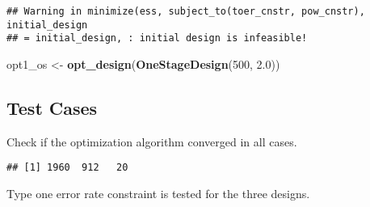 \documentclass[]{book}
\newenvironment{Shaded}{\begin{snugshade}}{\end{snugshade}}
\newcommand{\ControlFlowTok}[1]{\textcolor[rgb]{0.13,0.29,0.53}{\textbf{#1}}}
\newcommand{\DecValTok}[1]{\textcolor[rgb]{0.00,0.00,0.81}{#1}}
\newcommand{\FloatTok}[1]{\textcolor[rgb]{0.00,0.00,0.81}{#1}}
\newcommand{\KeywordTok}[1]{\textcolor[rgb]{0.13,0.29,0.53}{\textbf{#1}}}
\newcommand{\NormalTok}[1]{#1}
\newcommand{\OperatorTok}[1]{\textcolor[rgb]{0.81,0.36,0.00}{\textbf{#1}}}
\newcommand{\StringTok}[1]{\textcolor[rgb]{0.31,0.60,0.02}{#1}}
\begin{document}
\begin{verbatim}
## Warning in minimize(ess, subject_to(toer_cnstr, pow_cnstr), initial_design
## = initial_design, : initial design is infeasible!
\end{verbatim}

\begin{Shaded}
\begin{Highlighting}[]
\NormalTok{opt1_os <-}\StringTok{ }\KeywordTok{opt_design}\NormalTok{(}\KeywordTok{OneStageDesign}\NormalTok{(}\DecValTok{500}\NormalTok{, }\FloatTok{2.0}\NormalTok{))}
\end{Highlighting}
\end{Shaded}

\hypertarget{test-cases-7}{%
\subsection{Test Cases}\label{test-cases-7}}

Check if the optimization algorithm converged in all cases.

\begin{Shaded}
\end{Shaded}

\begin{verbatim}
## [1] 1960  912   20
\end{verbatim}

\begin{Shaded}
\end{Shaded}

Type one error rate constraint is tested for the three designs.
\end{document}
